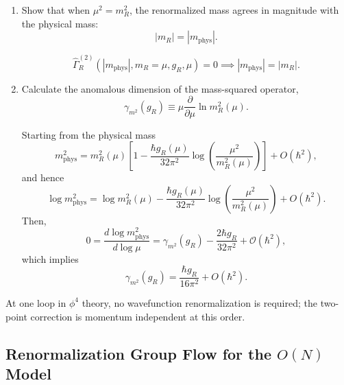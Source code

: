 \begin{enumerate}[label=\alph*), resume]
    \item Show that when $\mu^2=m_R^2$, the renormalized mass agrees in magnitude
    with the physical mass:
    \begin{equation}
        |m_R|=|m_{\mathrm{phys}}|.
    \end{equation}
    \begin{solution}
        \begin{equation}
            \widehat\Gamma_R^{(2)}(|m_\mathrm{phys}|,m_R = \mu,g_R,\mu) = 0 \implies |m_\mathrm{phys}| = |m_R|.
        \end{equation}
    \end{solution}

    \item Calculate the anomalous dimension of the mass-squared operator,
    \begin{equation}
        \gamma_{m^2}(g_R)
        \equiv
        \mu\frac{\partial}{\partial\mu}\ln m_R^2(\mu).
    \end{equation}
    \begin{solution}
    Starting from the physical mass
    \begin{equation}
        m_{\mathrm{phys}}^2
=
m_R^2(\mu)
\left[
1-
\frac{\hbar g_R(\mu)}{32\pi^2}
\log\left(\frac{\mu^2}{m_R^2(\mu)}\right)
\right]
+O(\hbar^2),
    \end{equation}
    and hence
    \begin{equation}
        \log m_{\mathrm{phys}}^2
=
\log m_R^2(\mu)
-
\frac{\hbar g_R(\mu)}{32\pi^2}
\log\left(\frac{\mu^2}{m_R^2(\mu)}\right)
+O(\hbar^2).
    \end{equation}
    Then,
        \begin{equation}
            0 = \frac{d\log m_\mathrm{phys}^2}{d\log \mu} = \gamma_{m^2}(g_R) - \frac{2\hbar g_R}{32\pi^2} + \mathcal{O}(\hbar^2),
        \end{equation}
        which implies
        \begin{equation}
                \gamma_{m^2}(g_R)
=
\frac{\hbar g_R}{16\pi^2}
+O(\hbar^2).
        \end{equation}
    \end{solution}
\end{enumerate}

At one loop in $\phi^4$ theory, no wavefunction renormalization is required; the
two-point correction is momentum independent at this order.

\subsection{Renormalization Group Flow for the $O(N)$ Model}

